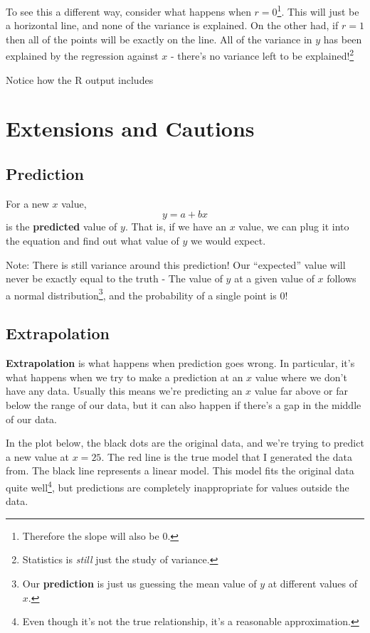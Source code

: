 \documentclass[
  letterpaper,
  DIV=11,
  numbers=noendperiod]{scrreprt}
\begin{document}
To see this a different way, consider what happens when
\(r = 0\)\footnote{Therefore the slope will also be 0.}. This will just
be a horizontal line, and none of the variance is explained. On the
other had, if \(r = 1\) then all of the points will be exactly on the
line. All of the variance in \(y\) has been explained by the regression
against \(x\) - there's no variance left to be explained!\footnote{Statistics
  is \emph{still} just the study of variance.}

Notice how the R output includes

\hypertarget{extensions-and-cautions}{%
\chapter{Extensions and Cautions}\label{extensions-and-cautions}}

\hypertarget{prediction}{%
\section{Prediction}\label{prediction}}

For a new \(x\) value, \[y = a + bx\] is the \textbf{predicted} value of
\(y\). That is, if we have an \(x\) value, we can plug it into the
equation and find out what value of \(y\) we would expect.

Note: There is still variance around this prediction! Our ``expected''
value will never be exactly equal to the truth - The value of \(y\) at a
given value of \(x\) follows a normal distribution\footnote{Our
  \textbf{prediction} is just us guessing the mean value of \(y\) at
  different values of \(x\).}, and the probability of a single point is
0!

\hypertarget{extrapolation}{%
\section{Extrapolation}\label{extrapolation}}

\textbf{Extrapolation} is what happens when prediction goes wrong. In
particular, it's what happens when we try to make a prediction at an
\(x\) value where we don't have any data. Usually this means we're
predicting an \(x\) value far above or far below the range of our data,
but it can also happen if there's a gap in the middle of our data.

In the plot below, the black dots are the original data, and we're
trying to predict a new value at \(x = 25\). The red line is the true
model that I generated the data from. The black line represents a linear
model. This model fits the original data quite well\footnote{Even though
  it's not the true relationship, it's a reasonable approximation.}, but
predictions are completely inappropriate for values outside the data.
\end{document}
